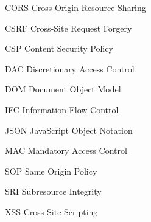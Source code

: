 %
\begin{siglas}
  \item[CORS] Cross-Origin Resource Sharing
  \item[CSRF] Cross-Site Request Forgery
  \item[CSP] Content Security Policy
  \item[DAC] Discretionary Access Control
  \item[DOM] Document Object Model
  \item[IFC] Information Flow Control
  \item[JSON] JavaScript Object Notation
  \item[MAC] Mandatory Access Control
  \item[SOP] Same Origin Policy
  \item[SRI] Subresource Integrity
  \item[XSS] Cross-Site Scripting
\end{siglas}



{\SingleSpacing
	\cleardoublepage
	\tableofcontents*
	\cleardoublepage
}
